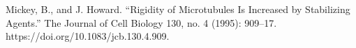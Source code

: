 \begin{thebibliography}{00}
\bibitem[]{}
Mickey, B., and J. Howard. “Rigidity of Microtubules Is Increased by Stabilizing Agents.” The Journal of Cell Biology 130, no. 4 (1995): 909–17. https://doi.org/10.1083/jcb.130.4.909.








 
% 
\end{thebibliography}